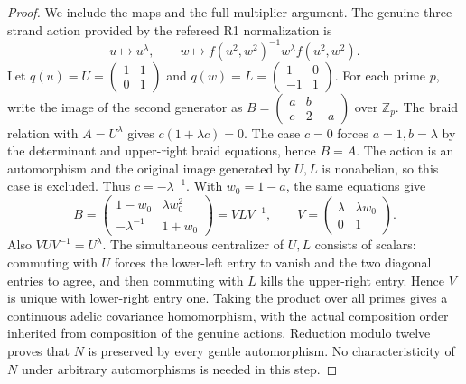\begin{proof}
We include the maps and the full-multiplier argument. The genuine
three-strand action provided by the refereed R1 normalization is
\[
 u\longmapsto u^\lambda,\qquad
 w\longmapsto f(u^2,w^2)^{-1}w^\lambda f(u^2,w^2).
\]
Let $q(u)=U=\left(\begin{smallmatrix}1&1\\0&1\end{smallmatrix}\right)$
and $q(w)=L=\left(\begin{smallmatrix}1&0\\-1&1\end{smallmatrix}\right)$.
For each prime $p$, write the image of the second generator as
$B=\left(\begin{smallmatrix}a&b\\c&2-a\end{smallmatrix}\right)$
over $\mathbb Z_p$. The braid relation with $A=U^\lambda$ gives
$c(1+\lambda c)=0$. The case $c=0$ forces $a=1,b=\lambda$
by the determinant and upper-right braid equations, hence $B=A$.
The action is an automorphism and the original image generated by
$U,L$ is nonabelian, so this case is excluded. Thus
$c=-\lambda^{-1}$. With $w_0=1-a$, the same equations give
\[
 B=\begin{pmatrix}1-w_0&\lambda w_0^2\\
                  -\lambda^{-1}&1+w_0\end{pmatrix}
   =VLV^{-1},\qquad
 V=\begin{pmatrix}\lambda&\lambda w_0\\0&1\end{pmatrix}.
\]
Also $VUV^{-1}=U^\lambda$. The simultaneous centralizer of $U,L$
consists of scalars: commuting with $U$ forces the lower-left
entry to vanish and the two diagonal entries to agree, and then
commuting with $L$ kills the upper-right entry. Hence $V$ is unique
with lower-right entry one. Taking the product over all primes
gives a continuous adelic covariance homomorphism, with the actual
composition order inherited from composition of the genuine actions.
Reduction modulo twelve proves that $N$ is preserved by every
gentle automorphism. No characteristicity of $N$ under arbitrary
automorphisms is needed in this step.


\end{proof}

